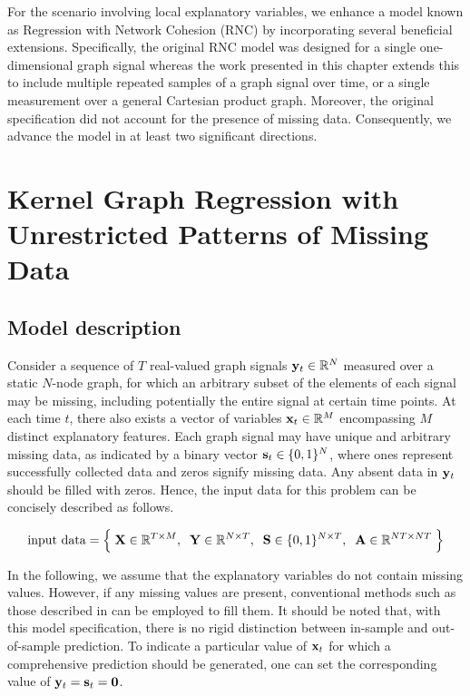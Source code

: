 For the scenario involving local explanatory variables, we enhance a model known as Regression with Network Cohesion (RNC) \citep{Li2019,Le2022} by incorporating several beneficial extensions. Specifically, the original RNC model was designed for a single one-dimensional graph signal whereas the work presented in this chapter extends this to include multiple repeated samples of a graph signal over time, or a single measurement over a general Cartesian product graph. Moreover, the original specification did not account for the presence of missing data. Consequently, we advance the model in at least two significant directions.

\section{Kernel Graph Regression with Unrestricted Patterns of Missing Data}

\label{sec:kgr_mdp}

\subsection{Model description}

\label{sec:kgr_model_desc}

Consider a sequence of $T$ real-valued graph signals $\mathbf{y}_t \in \mathbb{R}^N$ measured over a static $N$-node graph, for which an arbitrary subset of the elements of each signal may be missing, including potentially the entire signal at certain time points. At each time $t$, there also exists a vector of variables $\mathbf{x}_t \in \mathbb{R}^M$ encompassing $M$ distinct explanatory features. Each graph signal may have unique and arbitrary missing data, as indicated by a binary vector $\mathbf{s}_t \in \{0, 1\}^N$, where ones represent successfully collected data and zeros signify missing data. Any absent data in $\mathbf{y}_t$ should be filled with zeros. Hence, the input data for this problem can be concisely described as follows. 


\begin{equation*}
    \text{input data} = \Big\{ \; \mathbf{X} \in \mathbb{R}^{T \times M}, \;\; \mathbf{Y} \in \mathbb{R}^{N \times T}, \;\; \mathbf{S} \in \{0, 1\}^{N \times T} , \;\; \mathbf{A} \in \mathbb{R}^{NT \times NT} \; \Big\}
\end{equation*}


 In the following, we assume that the explanatory variables do not contain missing values. However, if any missing values are present, conventional methods such as those described in \cite{Little2019} can be employed to fill them. It should be noted that, with this model specification, there is no rigid distinction between in-sample and out-of-sample prediction. To indicate a particular value of $\mathbf{x}_t$ for which a comprehensive prediction should be generated, one can set the corresponding value of $\mathbf{y}_t = \mathbf{s}_t = \mathbf{0}$. 


